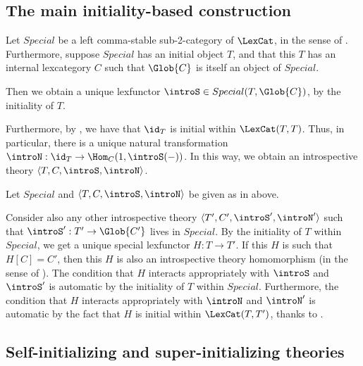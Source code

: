 \subsection{The main initiality-based construction}
\begin{construction}\label{SpecialInitialIntrosp}
Let $Special$ be a left comma-stable sub-2-category of $\LexCat$, in the sense of . Furthermore, suppose $Special$ has an initial object $T$, and that this $T$ has an internal lexcategory $C$ such that $\Glob{C}$ is itself an object of $Special$.

Then we obtain a unique lexfunctor $\introS \in Special(T, \Glob{C})$, by the initiality of $T$.

Furthermore, by , we have that $\id_T$ is initial within $\LexCat(T, T)$. Thus, in particular, there is a unique natural transformation $\introN : \id_T \to \Hom_C(1, \introS(-))$. In this way, we obtain an introspective theory $\langle T, C, \introS, \introN \rangle$.
\end{construction}

\begin{theorem}\label{SpecialInitialIntrospIsInitial}
Let $Special$ and $\langle T, C, \introS, \introN \rangle$ be given as in  above.

Consider also any other introspective theory $\langle T', C', \introS', \introN' \rangle$ such that $\introS' : T' \to \Glob{C'}$ lives in $Special$. By the initiality of $T$ within $Special$, we get a unique special lexfunctor $H : T \to T'$. If this $H$ is such that $H[C] = C'$, then this $H$ is also an introspective theory homomorphism (in the sense of ). The condition that $H$ interacts appropriately with $\introS$ and $\introS'$ is automatic by the initiality of $T$ within $Special$. Furthermore, the condition that $H$ interacts appropriately with $\introN$ and $\introN'$ is automatic by the fact that $H$ is initial within $\LexCat(T, T')$, thanks to .
\end{theorem}

\subsection{Self-initializing and super-initializing theories}
